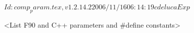 $Id: comp_param.tex,v 1.2.14.2 2006/11/16 06:14:19 cdeluca Exp $
%


<List F90 and C++ parameters and \#define constants>
